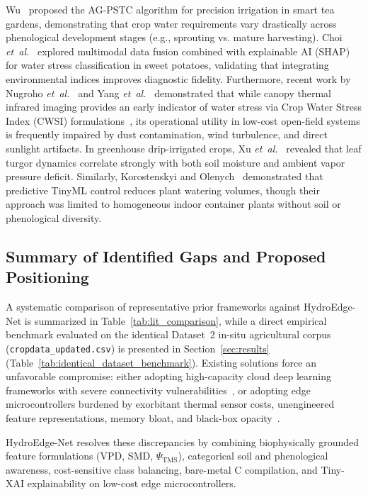 Wu~\cite{wu2026agpstc} proposed the AG-PSTC algorithm for precision irrigation in smart tea gardens, demonstrating that crop water requirements vary drastically across phenological development stages (e.g., sprouting vs. mature harvesting). Choi \textit{et~al.}~\cite{choi2025sweetpotato} explored multimodal data fusion combined with explainable AI (SHAP) for water stress classification in sweet potatoes, validating that integrating environmental indices improves diagnostic fidelity. Furthermore, recent work by Nugroho \textit{et~al.}~\cite{nugroho2025lowcost} and Yang \textit{et~al.}~\cite{yang2026watermelon} demonstrated that while canopy thermal infrared imaging provides an early indicator of water stress via Crop Water Stress Index (CWSI) formulations~\cite{jackson1981canopy, idso1981normalizing}, its operational utility in low-cost open-field systems is frequently impaired by dust contamination, wind turbulence, and direct sunlight artifacts. In greenhouse drip-irrigated crops, Xu \textit{et~al.}~\cite{xu2026turgor} revealed that leaf turgor dynamics correlate strongly with both soil moisture and ambient vapor pressure deficit. Similarly, Korostenskyi and Olenych~\cite{korostenskyi2025smart} demonstrated that predictive TinyML control reduces plant watering volumes, though their approach was limited to homogeneous indoor container plants without soil or phenological diversity.

\subsection{Summary of Identified Gaps and Proposed Positioning}

A systematic comparison of representative prior frameworks against HydroEdge-Net is summarized in Table~\ref{tab:lit_comparison}, while a direct empirical benchmark evaluated on the identical Dataset~2 in-situ agricultural corpus (\texttt{cropdata\_updated.csv}) is presented in Section~\ref{sec:results} (Table~\ref{tab:identical_dataset_benchmark}). Existing solutions force an unfavorable compromise: either adopting high-capacity cloud deep learning frameworks with severe connectivity vulnerabilities~\cite{jeaunita2025multitask}, or adopting edge microcontrollers burdened by exorbitant thermal sensor costs, unengineered feature representations, memory bloat, and black-box opacity~\cite{zaman2026aquasense}. 

HydroEdge-Net resolves these discrepancies by combining biophysically grounded feature formulations (VPD, SMD, $\Psi_{\text{TMS}}$), categorical soil and phenological awareness, cost-sensitive class balancing, bare-metal C compilation, and Tiny-XAI explainability on low-cost edge microcontrollers.

